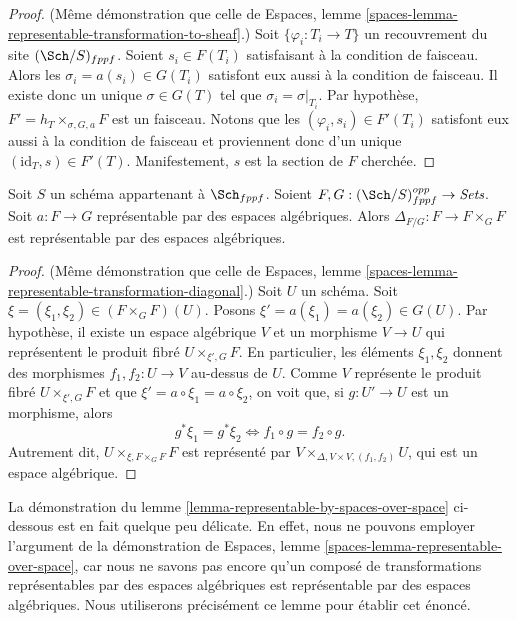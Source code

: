 \begin{proof}
(Même démonstration que celle de
Espaces, lemme \ref{spaces-lemma-representable-transformation-to-sheaf}.)
Soit $\{\varphi_i : T_i \to T\}$ un recouvrement du site
$(\Sch/S)_{fppf}$.
Soient $s_i \in F(T_i)$ satisfaisant à la condition de faisceau.
Alors les $\sigma_i = a(s_i) \in G(T_i)$ satisfont eux aussi à la condition
de faisceau. Il existe donc un unique $\sigma \in G(T)$ tel
que $\sigma_i = \sigma|_{T_i}$. Par hypothèse,
$F' = h_T \times_{\sigma, G, a} F$ est un faisceau.
Notons que les $(\varphi_i, s_i) \in F'(T_i)$ satisfont eux aussi à la
condition de faisceau et proviennent donc d'un unique
$(\text{id}_T, s) \in F'(T)$. Manifestement, $s$ est la section de
$F$ cherchée.
\end{proof}

\begin{lemma}
\label{lemma-representable-by-spaces-transformation-diagonal}
Soit $S$ un schéma appartenant à $\Sch_{fppf}$.
Soient $F, G : (\Sch/S)_{fppf}^{opp} \to \textit{Sets}$.
Soit $a : F \to G$ représentable par des espaces algébriques.
Alors $\Delta_{F/G} : F \to F \times_G F$ est représentable par
des espaces algébriques.
\end{lemma}

\begin{proof}
(Même démonstration que celle de
Espaces, lemme \ref{spaces-lemma-representable-transformation-diagonal}.)
Soit $U$ un schéma. Soit $\xi = (\xi_1, \xi_2) \in (F \times_G F)(U)$.
Posons $\xi' = a(\xi_1) = a(\xi_2) \in G(U)$.
Par hypothèse, il existe un espace algébrique $V$ et un morphisme $V \to U$
qui représentent le produit fibré $U \times_{\xi', G} F$.
En particulier, les éléments $\xi_1, \xi_2$ donnent des morphismes
$f_1, f_2 : U \to V$ au-dessus de $U$. Comme $V$ représente le
produit fibré $U \times_{\xi', G} F$ et que
$\xi' = a \circ \xi_1 = a \circ \xi_2$,
on voit que, si $g : U' \to U$ est un morphisme, alors
$$
g^*\xi_1 = g^*\xi_2
\Leftrightarrow
f_1 \circ g = f_2 \circ g.
$$
Autrement dit, $U \times_{\xi, F \times_G F} F$
est représenté par $V \times_{\Delta, V \times V, (f_1, f_2)} U$,
qui est un espace algébrique.
\end{proof}

\noindent
La démonstration du
lemme \ref{lemma-representable-by-spaces-over-space}
ci-dessous est en fait quelque peu délicate. En effet,
nous ne pouvons employer l'argument de la démonstration de
Espaces, lemme \ref{spaces-lemma-representable-over-space},
car nous ne savons pas encore qu'un composé de transformations
représentables par des espaces algébriques est représentable par des espaces
algébriques. Nous utiliserons précisément ce lemme pour établir cet énoncé.

